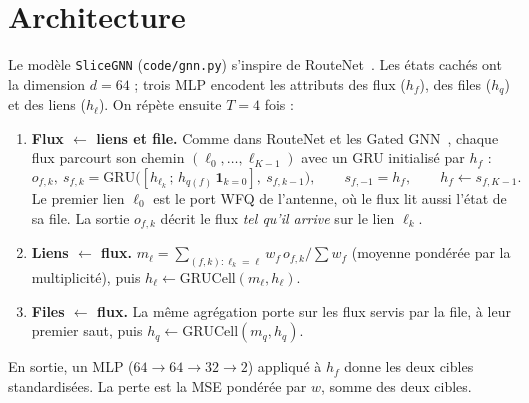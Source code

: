 \documentclass[11pt,a4paper]{report}
\begin{document}
\section{Architecture}
Le modèle \texttt{SliceGNN} (\texttt{code/gnn.py}) s'inspire de RouteNet~\cite{routenet,routenetf}. Les états cachés ont la dimension $d=64$ ; trois MLP encodent les attributs des flux ($h_f$), des files ($h_q$) et des liens ($h_\ell$). On répète ensuite $T=4$ fois :
\begin{enumerate}
  \item \textbf{Flux $\leftarrow$ liens et file.} Comme dans RouteNet et les Gated GNN~\cite{routenet,ggnn}, chaque flux parcourt son chemin $(\ell_0,\dots,\ell_{K-1})$ avec un GRU initialisé par $h_f$ :
  \begin{equation}
  o_{f,k},\ s_{f,k}=\mathrm{GRU}\big([h_{\ell_k}\,;\,h_{q(f)}\,\mathbf{1}_{k=0}],\ s_{f,k-1}\big),\qquad s_{f,-1}=h_f,\qquad h_f\leftarrow s_{f,K-1}.
  \end{equation}
  Le premier lien $\ell_0$ est le port WFQ de l'antenne, où le flux lit aussi l'état de sa file. La sortie $o_{f,k}$ décrit le flux \emph{tel qu'il arrive} sur le lien $\ell_k$.
  \item \textbf{Liens $\leftarrow$ flux.} $m_\ell=\sum_{(f,k):\ell_k=\ell}w_f\,o_{f,k}\big/\sum w_f$ (moyenne pondérée par la multiplicité), puis $h_\ell\leftarrow\mathrm{GRUCell}(m_\ell,h_\ell)$.
  \item \textbf{Files $\leftarrow$ flux.} La même agrégation porte sur les flux servis par la file, à leur premier saut, puis $h_q\leftarrow\mathrm{GRUCell}(m_q,h_q)$.
\end{enumerate}
En sortie, un MLP ($64\to64\to32\to2$) appliqué à $h_f$ donne les deux cibles standardisées. La perte est la MSE pondérée par $w$, somme des deux cibles.
\end{document}
